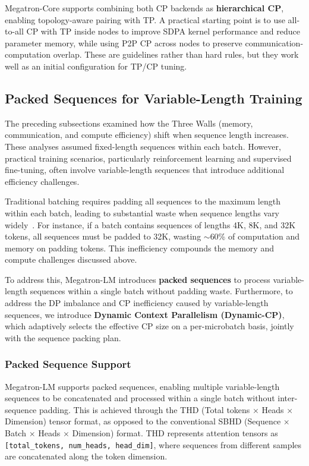 \documentclass[10pt,logo,copyright]{nvidiatechreport}
\begin{document}
Megatron-Core supports combining both CP backends as \textbf{hierarchical CP}, enabling topology-aware pairing with TP. A practical starting point is to use all-to-all CP with TP inside nodes to improve SDPA kernel performance and reduce parameter memory, while using P2P CP across nodes to preserve communication-computation overlap. These are guidelines rather than hard rules, but they work well as an initial configuration for TP/CP tuning.

\subsection{Packed Sequences for Variable-Length Training}\label{subsec:packed-sequence}

The preceding subsections examined how the Three Walls (memory, communication, and compute efficiency) shift when sequence length increases. These analyses assumed fixed-length sequences within each batch. However, practical training scenarios, particularly reinforcement learning and supervised fine-tuning, often involve variable-length sequences that introduce additional efficiency challenges.

Traditional batching requires padding all sequences to the maximum length within each batch, leading to substantial waste when sequence lengths vary widely~\cite{krell2021efficient}. For instance, if a batch contains sequences of lengths 4K, 8K, and 32K tokens, all sequences must be padded to 32K, wasting $\sim$60\% of computation and memory on padding tokens. This inefficiency compounds the memory and compute challenges discussed above.

To address this, Megatron-LM introduces \textbf{packed sequences} to process variable-length sequences within a single batch without padding waste. Furthermore, to address the DP imbalance and CP inefficiency caused by variable-length sequences, we introduce \textbf{Dynamic Context Parallelism (Dynamic-CP)}, which adaptively selects the effective CP size on a per-microbatch basis, jointly with the sequence packing plan.

\subsubsection{Packed Sequence Support}\label{subsec:packed_sequence_support}

Megatron-LM supports packed sequences, enabling multiple variable-length sequences to be concatenated and processed within a single batch without inter-sequence padding. This is achieved through the THD (Total tokens $\times$ Heads $\times$ Dimension) tensor format, as opposed to the conventional SBHD (Sequence $\times$ Batch $\times$ Heads $\times$ Dimension) format. THD represents attention tensors as \texttt{[total\_tokens, num\_heads, head\_dim]}, where sequences from different samples are concatenated along the token dimension.
\end{document}
